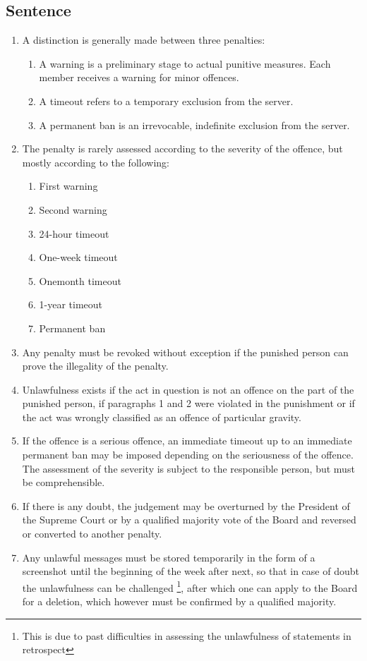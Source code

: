 \documentclass{article}
\begin{document}
\subsection{Sentence}
\begin{enumerate}[(1)]
	\item A distinction is generally made between three penalties:
	\begin{enumerate}[(1)]
		\item A warning is a preliminary stage to actual punitive measures. Each member receives a warning for minor offences.
		\item A timeout refers to a temporary exclusion from the server.
		\item A permanent ban is an irrevocable, indefinite exclusion from the server.
	\end{enumerate}
	\item The penalty is rarely assessed according to the severity of the offence, but mostly according to the following:
	\begin{enumerate}[1.]
		\item First warning
		\item Second warning
		\item 24-hour timeout
		\item One-week timeout
		\item One\-month timeout
		\item 1-year timeout
		\item Permanent ban
	\end{enumerate}
	\item Any penalty must be revoked without exception if the punished person can prove the illegality of the penalty.
	\item Unlawfulness exists if the act in question is not an offence on the part of the punished person, if paragraphs 1 and 2 were violated in the punishment or if the act was wrongly classified as an offence of particular gravity.
	\item If the offence is a serious offence, an immediate timeout up to an immediate permanent ban may be imposed depending on the seriousness of the offence. The assessment of the severity is subject to the responsible person, but must be comprehensible. 
	\item If there is any doubt, the judgement may be overturned by the President of the Supreme Court or by a qualified majority vote of the Board and reversed or converted to another penalty.
	\item Any unlawful messages must be stored temporarily in the form of a screenshot until the beginning of the week after next, so that in case of doubt the unlawfulness can be challenged \footnote{This is due to past difficulties in assessing the unlawfulness of statements in retrospect}, after which one can apply to the Board for a deletion, which however must be confirmed by a qualified majority.

\end{enumerate}
\end{document}
